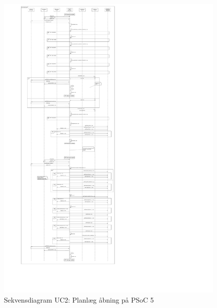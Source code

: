 \begin{figure}[H]
	\caption{Sekvensdiagram UC2: Planlæg åbning på PSoC 5}
	\label{SD:PSoC:UC2}
	\includegraphics[scale=0.18,trim=0 0 0 0, clip]{APPSoC/UC2-planlaeg-aabning-v1-simplified}
\end{figure}